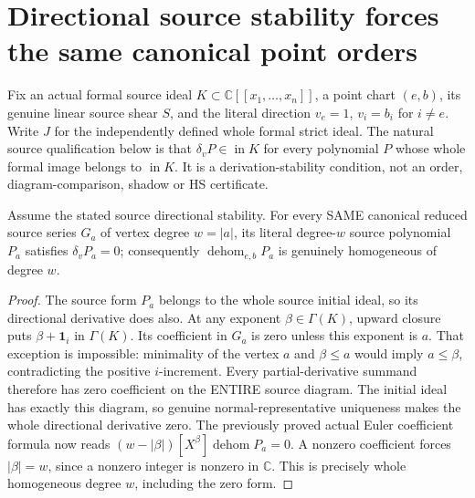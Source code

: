 \section{Directional source stability forces the same canonical point orders}

Fix an actual formal source ideal $K\subset\mathbb C[[x_1,\ldots,x_n]]$,
a point chart $(e,b)$, its genuine linear source shear $S$, and the literal
direction $v_e=1$, $v_i=b_i$ for $i\ne e$. Write $J$ for the independently
defined whole formal strict ideal. The natural source qualification below is
that $\delta_vP\in\operatorname{in}K$ for every polynomial $P$ whose whole
formal image belongs to $\operatorname{in}K$. It is a derivation-stability
condition, not an order, diagram-comparison, shadow or HS certificate.

\begin{theorem}
\label{hir:actual-canonical-directional-form-sparsity}
\leanok
Assume the stated source directional stability. For every SAME canonical
reduced source series $G_a$ of vertex degree $w=|a|$, its literal degree-$w$
source polynomial $P_a$ satisfies $\delta_vP_a=0$; consequently
$\operatorname{dehom}_{e,b}P_a$ is genuinely homogeneous of degree $w$.
\end{theorem}
\begin{proof}
The source form $P_a$ belongs to the whole source initial ideal, so its
directional derivative does also. At any exponent $\beta\in\Gamma(K)$,
upward closure puts $\beta+\mathbf1_i$ in $\Gamma(K)$. Its coefficient
in $G_a$ is zero unless this exponent is $a$. That exception is impossible:
minimality of the vertex $a$ and $\beta\le a$ would imply $a\le\beta$,
contradicting the positive $i$-increment. Every partial-derivative summand
therefore has zero coefficient on the ENTIRE source diagram. The initial
ideal has exactly this diagram, so genuine normal-representative uniqueness
makes the whole directional derivative zero. The previously proved actual
Euler coefficient formula now reads
$(w-|\beta|)[X^\beta]\operatorname{dehom}P_a=0$. A nonzero coefficient
forces $|\beta|=w$, since a nonzero integer is nonzero in $\mathbb C$.
This is precisely whole homogeneous degree $w$, including the zero form.
\end{proof}

